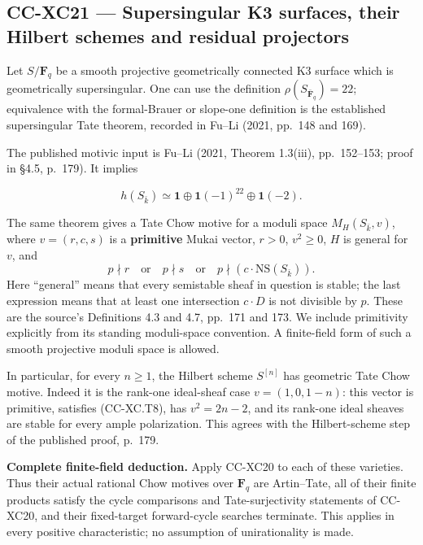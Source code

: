 \subsection{CC-XC21 --- Supersingular K3 surfaces, their Hilbert schemes
and residual
projectors}\label{cc-xc21-supersingular-k3-surfaces-their-hilbert-schemes-and-residual-projectors}

Let \(S/\mathbf F_q\) be a smooth projective geometrically connected K3
surface which is geometrically supersingular. One can use the definition
\(\rho(S_{\bar{\mathbf F}_q})=22\); equivalence with the formal-Brauer
or slope-one definition is the established supersingular Tate theorem,
recorded in Fu--Li (2021, pp.~148 and 169).

The published motivic input is Fu--Li (2021, Theorem 1.3(iii),
pp.~152--153; proof in §4.5, p.~179). It implies

\[
 h(S_{\bar k})\simeq
       \mathbf1\oplus\mathbf1(-1)^{22}\oplus\mathbf1(-2).
\tag{CC-XC.T7}
\]

The same theorem gives a Tate Chow motive for a moduli space
\(M_H(S_{\bar k},v)\), where \(v=(r,c,s)\) is a \textbf{primitive} Mukai
vector, \(r>0\), \(v^2\ge0\), \(H\) is general for \(v\), and \[
             p\nmid r\quad\text{or}\quad
             p\nmid s\quad\text{or}\quad
             p\nmid(c\cdot\mathrm{NS}(S_{\bar k})).
\tag{CC-XC.T8}
\] Here ``general'' means that every semistable sheaf in question is
stable; the last expression means that at least one intersection
\(c\cdot D\) is not divisible by \(p\). These are the source's
Definitions 4.3 and 4.7, pp.~171 and 173. We include primitivity
explicitly from its standing moduli-space convention. A finite-field
form of such a smooth projective moduli space is allowed.

In particular, for every \(n\ge1\), the Hilbert scheme \(S^{[n]}\) has
geometric Tate Chow motive. Indeed it is the rank-one ideal-sheaf case
\(v=(1,0,1-n)\): this vector is primitive, satisfies (CC-XC.T8), has
\(v^2=2n-2\), and its rank-one ideal sheaves are stable for every ample
polarization. This agrees with the Hilbert-scheme step of the published
proof, p.~179.

\textbf{Complete finite-field deduction.} Apply CC-XC20 to each of these
varieties. Thus their actual rational Chow motives over \(\mathbf F_q\)
are Artin--Tate, all of their finite products satisfy the cycle
comparisons and Tate-surjectivity statements of CC-XC20, and their
fixed-target forward-cycle searches terminate. This applies in every
positive characteristic; no assumption of unirationality is made.


